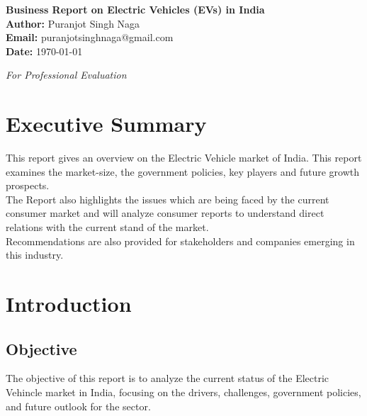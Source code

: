 \documentclass[a4paper,12pt]{report}
\begin{document}
\begin{titlepage}
    \centering
    \vspace*{5cm}
    {\Huge \textbf{Business Report on Electric Vehicles (EVs) in India}} \\
    \vspace{2cm}
    \textbf{Author:} Puranjot Singh Naga \\
    \textbf{Email:} puranjotsinghnaga@gmail.com \\
    \vspace{1cm}
    \textbf{Date:} \today \\
    \vfill
    \begin{center}
        {\large \textit{For Professional Evaluation}} \\
    \end{center}

\end{titlepage}



\tableofcontents
\newpage

\chapter*{Executive Summary}
This report gives an overview on the Electric Vehicle market of India. This report examines the market-size, the government policies, key players and future growth prospects. \\
The Report also highlights the issues which are being faced by the current consumer market and will analyze consumer reports to understand direct relations with the current stand of the market. \\
Recommendations are also provided for stakeholders and companies emerging in this industry. 





\chapter{Introduction}
\section{Objective}
The objective of this report is to analyze the current status of the Electric Vehincle market in India, focusing on the drivers, challenges, government policies, and future outlook for the sector.
\end{document}
